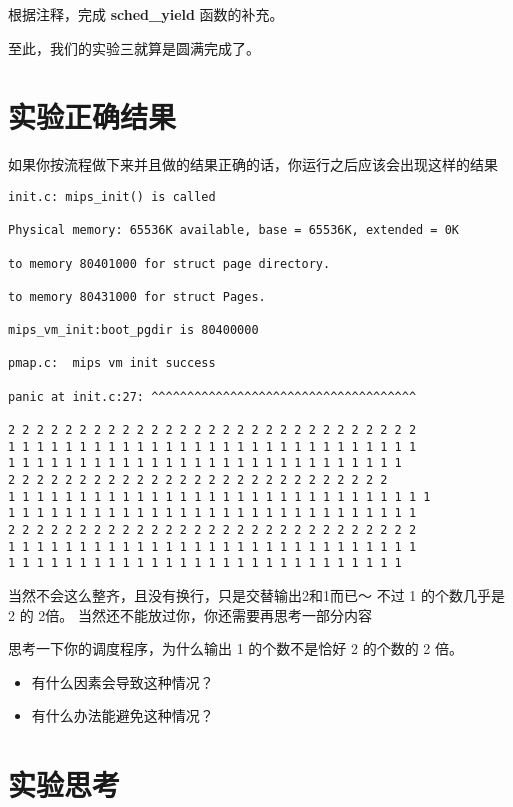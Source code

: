 \begin{exercise}
根据注释，完成 \textbf{sched\_yield }函数的补充。
\end{exercise}

至此，我们的实验三就算是圆满完成了。

\section{实验正确结果}
如果你按流程做下来并且做的结果正确的话，你运行之后应该会出现这样的结果

\begin{verbatim}
init.c: mips_init() is called

Physical memory: 65536K available, base = 65536K, extended = 0K

to memory 80401000 for struct page directory.

to memory 80431000 for struct Pages.

mips_vm_init:boot_pgdir is 80400000

pmap.c:  mips vm init success

panic at init.c:27: ^^^^^^^^^^^^^^^^^^^^^^^^^^^^^^^^^^^^^

2 2 2 2 2 2 2 2 2 2 2 2 2 2 2 2 2 2 2 2 2 2 2 2 2 2 2 2 2 
1 1 1 1 1 1 1 1 1 1 1 1 1 1 1 1 1 1 1 1 1 1 1 1 1 1 1 1 1
1 1 1 1 1 1 1 1 1 1 1 1 1 1 1 1 1 1 1 1 1 1 1 1 1 1 1 1
2 2 2 2 2 2 2 2 2 2 2 2 2 2 2 2 2 2 2 2 2 2 2 2 2 2 2 
1 1 1 1 1 1 1 1 1 1 1 1 1 1 1 1 1 1 1 1 1 1 1 1 1 1 1 1 1 1 
1 1 1 1 1 1 1 1 1 1 1 1 1 1 1 1 1 1 1 1 1 1 1 1 1 1 1 1 1
2 2 2 2 2 2 2 2 2 2 2 2 2 2 2 2 2 2 2 2 2 2 2 2 2 2 2 2 2 
1 1 1 1 1 1 1 1 1 1 1 1 1 1 1 1 1 1 1 1 1 1 1 1 1 1 1 1 1 
1 1 1 1 1 1 1 1 1 1 1 1 1 1 1 1 1 1 1 1 1 1 1 1 1 1 1 1
\end{verbatim}

当然不会这么整齐，且没有换行，只是交替输出2和1而已～ 不过 1 的个数几乎是 2 的 2倍。 当然还不能放过你，你还需要再思考一部分内容

\begin{thinking}\label{think-调度}
思考一下你的调度程序，为什么输出 1 的个数不是恰好 2 的个数的 2 倍。
  \begin{itemize}
    \item 有什么因素会导致这种情况？
    \item 有什么办法能避免这种情况？
  \end{itemize}
\end{thinking}

\section{实验思考}

